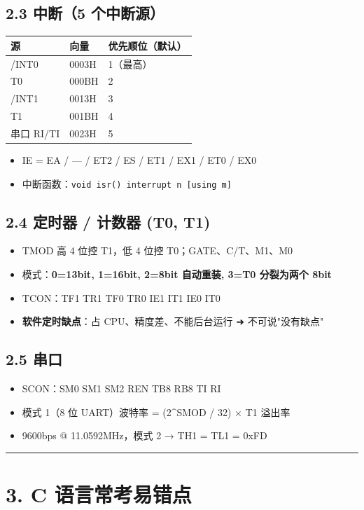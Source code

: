 \documentclass[UTF8,zihao=-5]{ctexart}
\renewcommand{\arraystretch}{0.9}
\begin{document}
\begin{multicols*}{2}
\subsection*{2.3 中断（5 个中断源）}
{\scriptsize\setlength{\tabcolsep}{1.8pt}\renewcommand{\arraystretch}{0.88}%
\begin{tabularx}{\linewidth}{@{}*{3}{Y}@{}}
\toprule
\textbf{源} & \textbf{向量} & \textbf{优先顺位（默认）} \\
\midrule
/INT0 & 0003H & 1（最高） \\
T0 & 000BH & 2 \\
/INT1 & 0013H & 3 \\
T1 & 001BH & 4 \\
串口 RI/TI & 0023H & 5 \\
\bottomrule
\end{tabularx}}
\begin{itemize}
\item IE = EA / — / ET2 / ES / ET1 / EX1 / ET0 / EX0
\item 中断函数：\texttt{void isr() interrupt n [using m]}
\end{itemize}
\subsection*{2.4 定时器 / 计数器 (T0, T1)}
\begin{itemize}
\item TMOD 高 4 位控 T1，低 4 位控 T0；GATE、C/T、M1、M0
\item 模式：\textbf{0=13bit, 1=16bit, 2=8bit 自动重装, 3=T0 分裂为两个 8bit}
\item TCON：TF1 TR1 TF0 TR0 IE1 IT1 IE0 IT0
\item \textbf{软件定时缺点}：占 CPU、精度差、不能后台运行 ➜ 不可说"没有缺点"
\end{itemize}
\subsection*{2.5 串口}
\begin{itemize}
\item SCON：SM0 SM1 SM2 REN TB8 RB8 TI RI
\item 模式 1（8 位 UART）波特率 = (2\textasciicircum{}SMOD / 32) × T1 溢出率
\item 9600bps @ 11.0592MHz，模式 2 → TH1 = TL1 = 0xFD
\end{itemize}
\vspace{1pt}\hrule\vspace{1pt}
\section*{3. C 语言常考易错点}

\end{multicols*}
\end{document}
